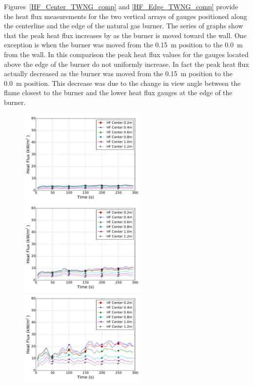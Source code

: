 \documentclass[twoside]{uocthesis}
\begin{document}
{Figures~\ref{HF_Center_TWNG_comp} and \ref{HF_Edge_TWNG_comp} provide the heat flux measurements for the two vertical arrays of gauges positioned along the centerline and the edge of the natural gas burner.  The series of graphs show that the peak heat flux increases by as the burner is moved toward the wall. One exception is when the burner was moved from the 0.15~m position to the 0.0~m from the wall. In this comparison the peak heat flux values for the gauges located above the edge of the burner do not uniformly increase.  In fact the peak heat flux actually decreased as the burner was moved from the 0.15~m position to the 0.0~m position. This decrease was due to the change in view angle between the flame closest to the burner and the lower heat flux gauges at the edge of the burner.

\begin{figure}[ht!]
	\centering
	\includegraphics[width=2.5in]{../Figures/TWNG01_HF_Center_Avg}
	\includegraphics[width=2.5in]{../Figures/TWNG03_HF_Center_Avg}\\
	\includegraphics[width=2.5in]{../Figures/TWNG05_HF_Center_Avg}

\end{figure}}
\end{document}
